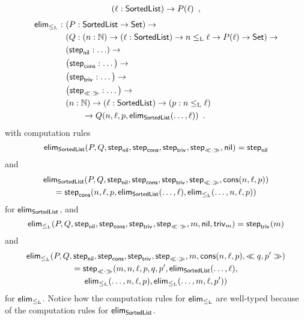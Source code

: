 \documentclass{schwicht}
\begin{document}
\begin{example}
\begin{align*}
                       & (\ell : \SortedList) \to P(\ell) \enspace , \\
  \end{align*}
  \begin{align*}
% 
     \elim_{\lessList} :\ & (P : \SortedList \to \Set) \to \\
                       & (Q : (n : \Nat) \to (\ell : \SortedList) \to n \lessList \ell \to P(\ell) \to \Set) \to \\
                       & (\stepind{\nilList} : \ldots) \to \\
                       & \big(\stepind{\consListbare} : \ldots\big) \to \\
                       & \big(\stepind{\nilLess{}} : \ldots\big) \to \\
                       & \big(\stepind{\consLessbare} : \ldots\big) \to \\
                       & (n : \Nat) \to (\ell : \SortedList) \to (p : n \lessList \ell) \\
                       & \qquad \to Q(n, \ell, p, \elim_{\SortedList}(\ldots, \ell)) \enspace .
  \end{align*}
with computation rules
%
\[
\elim_{\SortedList}(P, Q, \stepind{\nilList}, \stepind{\consListbare}, \stepind{\nilLess{}}, \stepind{\consLessbare}, \nilList) = \stepind{\nilList}
\]
and
\begin{multline*}
\elim_{\SortedList}(P, Q, \stepind{\nilList}, \stepind{\consListbare}, \stepind{\nilLess{}}, \stepind{\consLessbare}, \consList{n}{\ell}{p}) \\
= \stepind{\consListbare}(n, \ell, p, \elim_{\SortedList}(\ldots, \ell), 
\elim_{\lessList}(\ldots, n, \ell, p))  
\end{multline*}
%
for $\elim_{\SortedList}$, and
\[
\elim_{\lessList}(P, Q, \stepind{\nilList}, \stepind{\consListbare}, \stepind{\nilLess{}}, \stepind{\consLessbare}, m, \nilList, \nilLess{m}) = \stepind{\nilLess{}}(m)
\]
and
\begin{multline*}
\elim_{\lessList}(P, Q, \stepind{\nilList}, \stepind{\consListbare}, \stepind{\nilLess{}}, \stepind{\consLessbare}, m, \consList{n}{\ell}{p}, \consLess{m}{n}{\ell}{p}{q}{p'}) \\
= \stepind{\consLessbare}(m, n, \ell, p, q, p', \elim_{\SortedList}(\ldots, \ell), \\
\elim_{\lessList}(\ldots, n, \ell, p), \elim_{\lessList}(\ldots, m, \ell, p'))
\end{multline*}
for $\elim_{\lessList}$. Notice how the computation rules for
$\elim_{\lessList}$ are well-typed because of the computation rules
for $\elim_{\SortedList}$.


\end{example}
\end{document}
